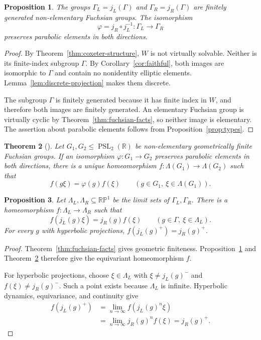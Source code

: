 \documentclass[11pt,reqno]{amsart}
\newcommand{\R}{\mathbb{R}}
\theoremstyle{plain}
\newtheorem{theorem}{Theorem}[section]
\newtheorem{proposition}[theorem]{Proposition}
\theoremstyle{definition}
\theoremstyle{remark}
\numberwithin{equation}{section}
\begin{document}
\begin{proposition}\label{prop:fuchsian}
The groups $\Gamma_L=j_L(\Gamma)$ and $\Gamma_R=j_R(\Gamma)$ are finitely generated non-elementary Fuchsian groups. The isomorphism
\[
\varphi=j_R\circ j_L^{-1}:\Gamma_L\longrightarrow\Gamma_R
\]
preserves parabolic elements in both directions.
\end{proposition}
\begin{proof}
By Theorem~\ref{thm:coxeter-structure}, $W$ is not virtually solvable. Neither is its finite-index subgroup $\Gamma$. By Corollary~\ref{cor:faithful}, both images are isomorphic to $\Gamma$ and contain no nonidentity elliptic elements. Lemma~\ref{lem:discrete-projection} makes them discrete.

The subgroup $\Gamma$ is finitely generated because it has finite index in $W$, and therefore both images are finitely generated. An elementary Fuchsian group is virtually cyclic by Theorem~\ref{thm:fuchsian-facts}, so neither image is elementary. The assertion about parabolic elements follows from Proposition~\ref{prop:types}.
\end{proof}

\begin{theorem}[{\cite[Theorem~3.3]{Tukia1985}}]\label{thm:tukia}
Let $G_1,G_2\leq\operatorname{PSL}_2(\R)$ be non-elementary geometrically finite Fuchsian groups. If an isomorphism $\varphi:G_1\to G_2$ preserves parabolic elements in both directions, there is a unique homeomorphism $f:\Lambda(G_1)\to\Lambda(G_2)$ such that
\[
f(g\xi)=\varphi(g)f(\xi)\qquad(g\in G_1,\ \xi\in\Lambda(G_1)).
\]
\end{theorem}

\begin{proposition}\label{prop:boundary}
Let $\Lambda_L,\Lambda_R\subseteq\mathbb{RP}^1$ be the limit sets of $\Gamma_L,\Gamma_R$. There is a homeomorphism $f:\Lambda_L\to\Lambda_R$ such that
\[
f(j_L(g)\xi)=j_R(g)f(\xi)\qquad(g\in\Gamma,\ \xi\in\Lambda_L).
\]
For every $g$ with hyperbolic projections, $f(j_L(g)^+)=j_R(g)^+$.
\end{proposition}
\begin{proof}
Theorem~\ref{thm:fuchsian-facts} gives geometric finiteness. Proposition~\ref{prop:fuchsian} and Theorem~\ref{thm:tukia} therefore give the equivariant homeomorphism $f$.

For hyperbolic projections, choose $\xi\in\Lambda_L$ with $\xi\neq j_L(g)^-$ and $f(\xi)\neq j_R(g)^-$. Such a point exists because $\Lambda_L$ is infinite. Hyperbolic dynamics, equivariance, and continuity give
\[
\begin{aligned}
f(j_L(g)^+)&=\lim_{n\to\infty}f(j_L(g)^n\xi)\\
&=\lim_{n\to\infty}j_R(g)^nf(\xi)=j_R(g)^+.
\end{aligned}
\]
\end{proof}
\end{document}
